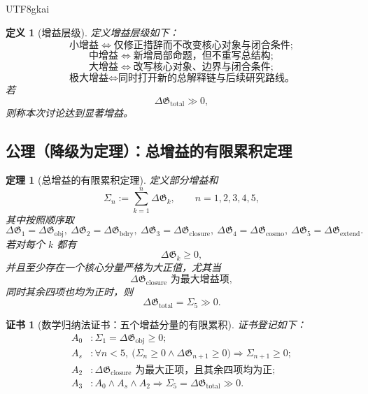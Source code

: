 \documentclass[12pt]{article}
\newtheorem{definition}{定义}[section]
\newtheorem{theorem}{定理}[section]
\newtheorem{Certificate}{证书}[section]
\begin{document}
\begin{CJK*}{UTF8}{gkai}
\begin{definition}[增益层级]
\label{def:tex43-gain-scale}
定义增益层级如下：
\[
  \text{小增益}
  \iff
  \text{仅修正措辞而不改变核心对象与闭合条件};
\]
\[
  \text{中增益}
  \iff
  \text{新增局部命题，但不重写总结构};
\]
\[
  \text{大增益}
  \iff
  \text{改写核心对象、边界与闭合条件};
\]
\[
  \text{极大增益}
  \iff
  \text{同时打开新的总解释链与后续研究路线。}
\]
若
\[
  \Delta \mathfrak G_{\mathrm{total}} \gg 0,
\]
则称本次讨论达到\emph{显著增益}。
\end{definition}

\subsection{公理（降级为定理）：总增益的有限累积定理}
\label{subsec:tex43-ch11-axiom-downgrade}

\begin{theorem}[总增益的有限累积定理]
\label{thm:tex43-gain-additivity}
定义部分增益和
\[
  \Sigma_n
  :=
  \sum_{k=1}^{n}\Delta \mathfrak G_k,
  \qquad
  n=1,2,3,4,5,
\]
其中按照顺序取
\[
  \Delta \mathfrak G_1=\Delta \mathfrak G_{\mathrm{obj}},\
  \Delta \mathfrak G_2=\Delta \mathfrak G_{\mathrm{bdry}},\
  \Delta \mathfrak G_3=\Delta \mathfrak G_{\mathrm{closure}},\
  \Delta \mathfrak G_4=\Delta \mathfrak G_{\mathrm{cosmo}},\
  \Delta \mathfrak G_5=\Delta \mathfrak G_{\mathrm{extend}}.
\]
若对每个 $k$ 都有
\[
  \Delta \mathfrak G_k \ge 0,
\]
并且至少存在一个核心分量严格为大正值，尤其当
\[
  \Delta \mathfrak G_{\mathrm{closure}} \text{ 为最大增益项},
\]
同时其余四项也均为正时，则
\[
  \Delta \mathfrak G_{\mathrm{total}}=\Sigma_5 \gg 0.
\]
\end{theorem}

\begin{Certificate}[数学归纳法证书：五个增益分量的有限累积]
\label{cert:tex43-gain-additivity}
证书登记如下：
\[
\begin{aligned}
  A_0 &: \Sigma_1=\Delta \mathfrak G_{\mathrm{obj}}\ge 0;\\
  A_s &: \forall n<5,\
         \bigl(
           \Sigma_n\ge 0\wedge \Delta \mathfrak G_{n+1}\ge 0
         \bigr)
         \Rightarrow
         \Sigma_{n+1}\ge 0;\\
  A_2 &: \Delta \mathfrak G_{\mathrm{closure}}
         \text{ 为最大正项，且其余四项均为正};\\
  A_3 &: A_0\wedge A_s\wedge A_2
         \Rightarrow
         \Sigma_5=\Delta \mathfrak G_{\mathrm{total}}\gg 0.
\end{aligned}
\]
\end{Certificate}


\end{CJK*}
\end{document}
